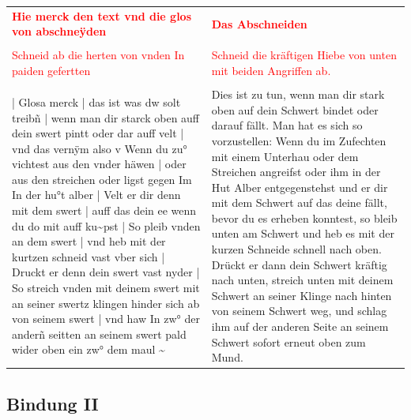 \begin{longtable}{p{6.25cm}p{6.25cm}}
\textbf{\textcolor{red}{Hie merck den text vnd die glos von abschneÿden}}
&
\textbf{\textcolor{red}{Das Abschneiden}}
\\
\\
\textcolor{red}{Schneid ab die herten von vnden In paiden gefertten}
&
\textcolor{red}{Schneid die kräftigen Hiebe von unten mit beiden Angriffen ab.}
\\
\\
| Glosa merck | das ist was dw solt treibñ | wenn man dir starck oben auff dein swert pintt oder dar auff velt | vnd das vernÿm also v Wenn du zu° vichtest aus den vnder häwen | oder aus den streichen oder ligst gegen Im In der hu°t alber | Velt er dir denn mit dem swert | auff das dein ee wenn du do mit auff ku\textasciitilde pst | So pleib vnden an dem swert | vnd heb mit der kurtzen schneid vast vber sich | Druckt er denn dein swert vast nyder | So streich vnden mit deinem swert mit an seiner swertz klingen hinder sich ab von seinem swert | vnd haw In zw° der anderñ seitten an seinem swert pald wider oben ein zw° dem maul \textasciitilde 
&
Dies ist zu tun, wenn man dir stark oben auf dein Schwert bindet oder darauf fällt. Man hat es sich so vorzustellen: Wenn du im Zufechten mit einem Unterhau oder dem Streichen angreifst oder ihm in der Hut Alber entgegenstehst und er dir mit dem Schwert auf das deine fällt, bevor du es erheben konntest, so bleib unten am Schwert und heb es mit der kurzen Schneide schnell nach oben. Drückt er dann dein Schwert kräftig nach unten, streich unten mit deinem Schwert an seiner Klinge nach hinten von seinem Schwert weg, und schlag ihm auf der anderen Seite an seinem Schwert sofort erneut oben zum Mund.
\end{longtable}

\newpage

\begin{center}
\end{center}

\newpage

\subsection{Bindung II}  \label{Bindung2}

